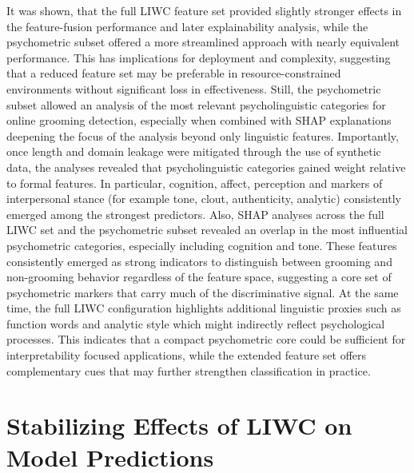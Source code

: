 It was shown, that the full LIWC feature set provided slightly stronger effects in the feature-fusion performance and later explainability analysis, while the psychometric subset offered a more streamlined approach with nearly equivalent performance. This has implications for deployment and complexity, suggesting that a reduced feature set may be preferable in resource-constrained environments without significant loss in effectiveness. Still, the psychometric subset allowed an analysis of the most relevant psycholinguistic categories for online grooming detection, especially when combined with SHAP explanations deepening the focus of the analysis beyond only linguistic features. Importantly, once length and domain leakage were mitigated through the use of synthetic data, the analyses revealed that psycholinguistic categories gained weight relative to formal features. In particular, cognition, affect, perception and markers of interpersonal stance (for example tone, clout, authenticity, analytic) consistently emerged among the strongest predictors. Also, SHAP analyses across the full LIWC set and the psychometric subset revealed an overlap in the most influential psychometric categories, especially including cognition and tone. These features consistently emerged as strong indicators to distinguish between grooming and non-grooming behavior regardless of the feature space, suggesting a core set of psychometric markers that carry much of the discriminative signal. At the same time, the full LIWC configuration highlights additional linguistic proxies such as function words and analytic style which might indirectly reflect psychological processes. This indicates that a compact psychometric core could be sufficient for interpretability focused applications, while the extended feature set offers complementary cues that may further strengthen classification in practice.

\section{Stabilizing Effects of LIWC on Model Predictions}

